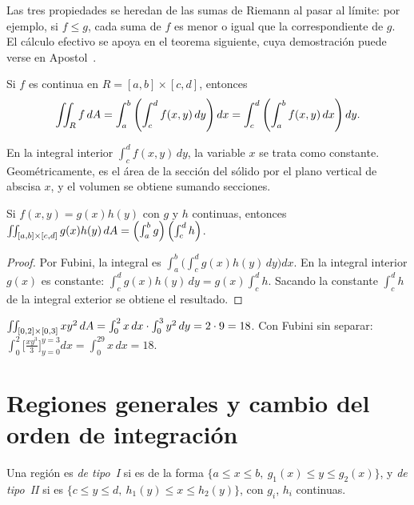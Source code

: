 Las tres propiedades se heredan de las sumas de Riemann al pasar al límite: por ejemplo, si $f\le g$, cada suma de $f$ es menor o igual que la correspondiente de $g$. El cálculo efectivo se apoya en el teorema siguiente, cuya demostración puede verse en Apostol~\cite[§11.10--11.11]{apostol2}.

\begin{teorema}\label{teo:fubini}
Si $f$ es continua en $R=[a,b]\times[c,d]$, entonces
\[
\iint_R f\,dA=\int_a^b\left(\int_c^d f(x,y)\,dy\right)dx=\int_c^d\left(\int_a^b f(x,y)\,dx\right)dy .
\]
\end{teorema}

En la integral interior $\int_c^df(x,y)\,dy$, la variable $x$ se trata como constante. Geométricamente, es el área de la sección del sólido por el plano vertical de abscisa $x$, y el volumen se obtiene sumando secciones.

\begin{corolario}\label{cor:separable}
Si $f(x,y)=g(x)h(y)$ con $g$ y $h$ continuas, entonces $\iint_{[a,b]\times[c,d]}g(x)h(y)\,dA=\left(\int_a^bg\right)\left(\int_c^dh\right)$.
\end{corolario}

\begin{proof}
Por Fubini, la integral es $\int_a^b\bigl(\int_c^dg(x)h(y)\,dy\bigr)dx$. En la integral interior $g(x)$ es constante: $\int_c^dg(x)h(y)\,dy=g(x)\int_c^dh$. Sacando la constante $\int_c^dh$ de la integral exterior se obtiene el resultado.
\end{proof}

\begin{ejemplo}\label{ej:t6-rectangulo}
$\iint_{[0,2]\times[0,3]}xy^2\,dA=\int_0^2x\,dx\cdot\int_0^3y^2\,dy=2\cdot9=18$. Con Fubini sin separar: $\int_0^2\bigl[\tfrac{xy^3}{3}\bigr]_{y=0}^{y=3}dx=\int_0^29x\,dx=18$.
\end{ejemplo}

\section{Regiones generales y cambio del orden de integración}

\begin{definicion}\label{def:regiones}
Una región es \emph{de tipo~I} si es de la forma $\{a\le x\le b,\ g_1(x)\le y\le g_2(x)\}$, y \emph{de tipo~II} si es $\{c\le y\le d,\ h_1(y)\le x\le h_2(y)\}$, con $g_i$, $h_i$ continuas.
\end{definicion}

